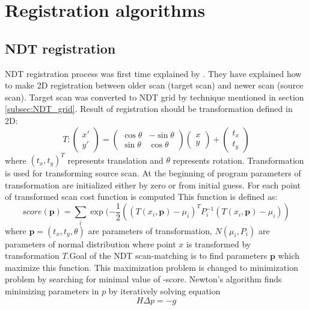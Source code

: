 \newpage   
\section{Registration algorithms}
\label{sec:reg_alg}
\subsection{NDT registration}
\label{subsec:P2D_NDT}
NDT registration process was first time explained by \cite{Biber03}. They have explained how to make 2D registration between older scan (target scan) and newer scan (source scan). Target scan was converted to NDT grid by technique mentioned in section \ref{subsec:NDT_grid}. Result of registration should be transformation defined in 2D:
\begin{equation}
T: 
\begin{pmatrix}
x' \\ y'
\end{pmatrix}
=
\begin{pmatrix}
\cos \theta  & -\sin \theta\\
\sin \theta & \cos \theta
\end{pmatrix}
\begin{pmatrix}
x \\ y
\end{pmatrix}
+
\begin{pmatrix}
t_{x} \\ t_{y} 
\end{pmatrix}
\end{equation}
where $ (t_{x},t_{y})^{T}$ represents translation and $\theta$ represents rotation. Transformation is used for transforming source scan. At the beginning of program parameters of transformation are initialized either by zero or from initial guess. For each point of transformed scan cost function is computed This function is defined as:
\begin{equation}
score(\textbf{p}) = \sum_{i}^{} \exp(-\frac{1}{2} ((T(x_{i},\textbf{p})- \mu_{i})^{T} P^{-1}_{i}   (T(x_{i},\textbf{p})- \mu_{i}) ) 
\end{equation}
where $\textbf{p} = (t_{x},t_{y}, \theta)$ are parameters of transformation, $N(\mu_{i},P_{i})$ are parameters of normal distribution where point $x$ is transformed by transformation $T$.Goal of the NDT scan-matching is to find parameters $\textbf{p}$ which maximize this function. This maximization problem is changed to minimization problem by searching for minimal value of -score. Newton's algorithm finds minimizing parameters in $p$ by iteratively solving equation 
\begin{equation}
 H \varDelta p = -g
\end{equation}  

